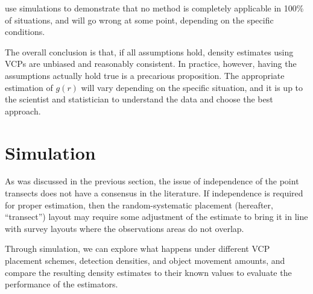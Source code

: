 \documentclass[12pt]{article}
\begin{document}
\textcite{roeder1987} use simulations to demonstrate that no method is completely applicable in 100\% of situations, and will go wrong at some point, depending on the specific conditions.

The overall conclusion is that, if all assumptions hold, density estimates using VCPs are unbiased and reasonably consistent. In practice, however, having the assumptions actually hold true is a precarious proposition. The appropriate estimation of $g(r)$ will vary depending on the specific situation, and it is up to the scientist and statistician to understand the data and choose the best approach.

\section{Simulation}
As was discussed in the previous section, the issue of independence of the point transects does not have a consensus in the literature. If independence is required for proper estimation, then the random-systematic placement (hereafter, ``transect'') layout may require some adjustment of the estimate to bring it in line with survey layouts where the observations areas do not overlap.

Through simulation, we can explore what happens under different VCP placement schemes, detection densities, and object movement amounts, and compare the resulting density estimates to their known values to evaluate the performance of the estimators.
\end{document}
